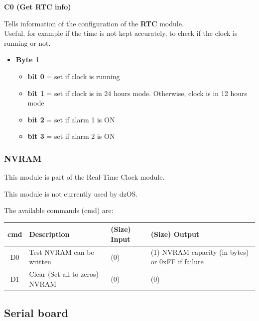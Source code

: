 \documentclass[a4paper,11pt]{article}
\begin{document}
    \textbf{C0 (Get RTC info)}

    Tells information of the configuration of the \textbf{RTC} module.\\

    Useful, for example if the time is not kept accurately, to check if the
    clock is running or not.

     \begin{itemize}
        \item \textbf{Byte 1}
        \begin{itemize}
            \item \textbf{bit 0} = set if clock is running
            \item \textbf{bit 1} = set if clock is in 24 hours mode. Otherwise,
            clock is in 12 hours mode
            \item \textbf{bit 2} = set if alarm 1 is ON
            \item \textbf{bit 3} = set if alarm 2 is ON
        \end{itemize}
    \end{itemize}

     \subsubsection{NVRAM}
 
     This module is part of the Real-Time Clock module.

     This module is not currently used by dzOS.
 
     The available commands (cmd) are:
 
     \begin{tabular}{| c | m{3.8cm} | m{3cm} | m{3.5cm} | }
         \hline
         \rowcolor{lightgray}
         cmd & Description & (Size) Input & (Size) Output\\
         \hline
         D0 & Test  NVRAM can be written & (0) & (1) NVRAM capacity (in bytes) or 0xFF if failure\\
         \hline
         D1 & Clear (Set all to zeros) NVRAM & (0) & (0) \\
         \hline
     \end{tabular}

    \subsection{Serial board}
\end{document}
